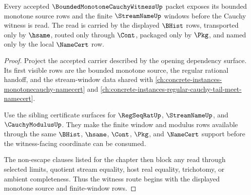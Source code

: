 \begin{theorem}
\label{thm:bounded-monotone-cauchy-witness-root-monotone-window-totality}
Every accepted $\BoundedMonotoneCauchyWitnessUp$ packet exposes its bounded monotone source rows and the finite $\StreamNameUp$ windows before the Cauchy witness is read. The read is carried by the displayed $\BHist$ rows, transported only by $\hsame$, routed only through $\Cont$, packaged only by $\Pkg$, and named only by the local $\NameCert$ row.
\end{theorem}
\begin{proof}
Project the accepted carrier described by the opening dependency surface. Its first visible rows are the bounded monotone source, the regular rational handoff, and the stream-window data shared with \autoref{ch:concrete-instances-monotonecauchy-namecert} and \autoref{ch:concrete-instances-regular-cauchy-tail-meet-namecert}.

Use the sibling certificate surfaces for $\RegSeqRatUp$, $\StreamNameUp$, and $\CauchyModulusUp$. They make the finite window and modulus rows available through the same $\BHist$, $\hsame$, $\Cont$, $\Pkg$, and $\NameCert$ support before the witness-facing coordinate can be consumed.

The non-escape clauses listed for the chapter then block any read through selected limits, quotient stream equality, host real equality, trichotomy, or ambient completeness. Thus the witness route begins with the displayed monotone source and finite-window rows.
\end{proof}

